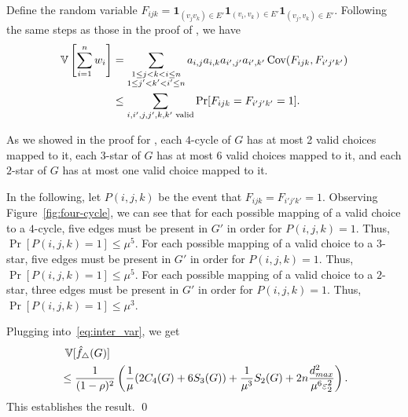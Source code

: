 {Define the random variable $F_{ijk} = \textbf{1}_{(v_j v_k) \in E'}
\textbf{1}_{(v_i, v_k) \in E'} \allowbreak \textbf{1}_{(v_j, v_k) \in E'}$. Following the same
steps as those in the proof of \AlgTwo{}, we have
\begin{align*}
  \operatorname{\mathbb{V}}\left[\sum_{i=1}^n w_i\right]
  &= \sum_{\substack{1 \leq j < k < i \leq n \\ 1 \leq j' < k' <
  i' \leq n}} a_{i,j} a_{i,k} a_{i',j'} a_{i',k'} \operatorname{\text{Cov}}(F_{ijk}, F_{i'j'k'}) \\
  &\leq
  \sum_{i,i',j,j',k,k'\text{ valid}} \Pr[F_{ijk} = F_{i'j'k'} = 1].
\end{align*}

As we showed in the proof for \AlgTwo{}, each $4$-cycle of $G$ has at most
2 valid choices mapped to it, each $3$-star of $G$ has at most 6 valid
choices mapped to it, and each $2$-star of $G$ has at most one valid choice
mapped to it.

In the following, let $P(i,j,k)$ be the event that $F_{ijk} = F_{i'j'k'} = 1$.
Observing Figure~\ref{fig:four-cycle}, we can see that for each possible
mapping of a valid choice to a $4$-cycle, five edges must be present in $G'$ in
order for $P(i,j,k) = 1$. Thus, $\Pr[P(i,j,k) = 1] \leq \mu^5$. For each possible
mapping of a valid choice to a $3$-star, five edges must be present in $G'$ in
order for $P(i,j,k) = 1$. Thus, $\Pr[P(i,j,k) = 1] \leq \mu^5$. For each possible
mapping of a valid choice to a $2$-star, three edges must be present in $G'$ in
order for $P(i,j,k) = 1$. Thus, $\Pr[P(i,j,k) = 1] \leq \mu^3$.

Plugging into~\eqref{eq:inter_var}, we get
\begin{align*}
  &\;\operatorname{\mathbb{V}}[\hat{f}_\triangle(G)] \\
  &\leq \frac{1}{(1-\rho)^2} \left(\frac{1}{\mu}(2C_4(G) + 6S_3(G)) + \frac{1}{\mu^3} S_2(G) + 2n\frac{d_{max}^2}{\mu^6\varepsilon_2^2}\right).
\end{align*}
This establishes the result.
\qed

}
